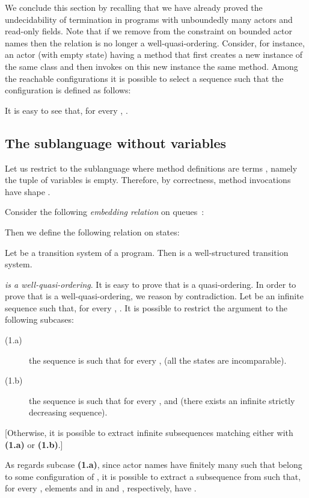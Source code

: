 \documentclass{LMCS}
\theoremstyle{plain}\newtheorem{proposition}[thm]{Proposition}
\theoremstyle{plain}\newtheorem{lemma}[thm]{Lemma}
\theoremstyle{plain}\newtheorem{theorem}[thm]{Theorem}
\theoremstyle{plain}\newtheorem{corollary}[thm]{Corollary}
\newif\ifconf \conffalse
\newcommand{\actroba}{}
\begin{document}
We conclude this section by recalling that 
we have already proved
the undecidability of termination in programs with unboundedly many 
actors and read-only fields.
Note that 
if we remove from {\actroba} the constraint on bounded actor names
then  the relation  is no longer a well-quasi-ordering.
Consider, for instance, an actor (with empty state) having a method 
that first creates a new instance of the same class and then invokes 
on this new instance the same method. Among the reachable configurations
it is possible to select a sequence 
 such that
the configuration  is defined as follows:

It is easy to see that, 
for every ,  . 



\iffalse
\subsection{The sublanguage without variables}
Let us restrict to the sublanguage where method definitions 
are terms , namely the tuple of variables is empty. Therefore,
by correctness, method invocations have shape .


Consider the following \emph{embedding relation} on queues~\cite{Finkel:2001}:

Then we define the following relation on states:




\begin{thm}
Let  be a transition system of a program. 
Then  is a well-structured transition system.
\end{thm}

\ifconf
\else
{} \emph{ is a well-quasi-ordering}. It is easy to prove that 
 is a quasi-ordering.
In order to prove that  is a well-quasi-ordering, we reason by contradiction.
Let  be 
an infinite sequence such that, for every ,  . It is possible to restrict the argument to the following subcases:
\begin{description}
\item[(1.a)] 
the sequence is such that for every ,   (all the states are incomparable).
\item[(1.b)] 
the sequence is such that for every ,   and 
 (there exists an infinite strictly decreasing sequence).
\end{description}
[Otherwise, it is possible to extract infinite subsequences matching either with 
{\bf (1.a)} or {\bf (1.b)}.]

As regards subcase {\bf (1.a)}, since actor names  have finitely
many  such that  belong to some configuration of ,
it is possible to extract 
a subsequence  from 
 such that, for every , elements  and 
in  and , respectively, have .
\end{document}
